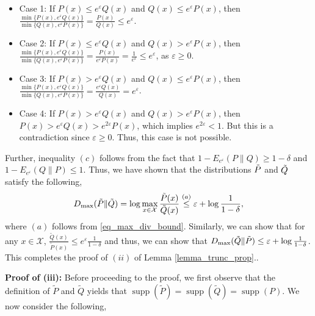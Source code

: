 \documentclass[onecolumn,ldraftcls, 11pt]{IEEEtran}
\newcommand{\supp}{\operatorname{supp}}
\newcommand{\eps}{\varepsilon}
\newcommand*{\cX}{\mathcal{X}}
\begin{document}
\begin{itemize}
    \item Case 1: If $P(x) \leq e^\eps Q(x)$ and $Q(x) \leq e^\eps P(x)$, then $\frac{\min\{P(x),e^\eps Q(x)\}}{\min\{Q(x),e^\eps P(x)\}} = \frac{P(x)}{Q(x)} \leq e^\eps $.
    \item Case 2: If $P(x) \leq e^\eps Q(x)$ and $Q(x) > e^\eps P(x)$, then $\frac{\min\{P(x),e^\eps Q(x)\}}{\min\{Q(x),e^\eps P(x)\}} = \frac{P(x)}{e^\eps P(x)} = \frac{1}{e^\eps} \leq e^\eps$, as $\eps \geq 0$.
    \item Case 3: If $P(x) > e^\eps Q(x)$ and $Q(x) \leq e^\eps P(x)$, then $\frac{\min\{P(x),e^\eps Q(x)\}}{\min\{Q(x),e^\eps P(x)\}} = \frac{e^\eps Q(x)}{Q(x)} = e^\eps$.
    \item Case 4: If $P(x) > e^\eps Q(x)$ and $Q(x) > e^\eps P(x)$, then $ P(x) > e^\eps Q(x) > e^{2\eps} P(x)$, which implies $e^{2\eps} < 1$. But this is a contradiction since $\eps \geq 0$. Thus, this case is not possible.
\end{itemize}
 Further, inequality $(c)$ follows from the fact that $1 - E_{e^\eps}(P\|Q) \geq 1-\delta$ and $1 - E_{e^\eps}(Q\|P) \leq 1$. Thus, we have shown that the distributions $\Tilde{P}$ and $\Tilde{Q}$ satisfy the following,
\begin{align*}
    D_{\max}(\Tilde{P}\|\Tilde{Q}) = \log \max_{x \in \cX} \frac{\tilde{P}(x)}{\tilde{Q}(x)}
     \overset{(a)}{\leq} \eps + \log\frac{1}{1-\delta},\\
\end{align*}
where $(a)$ follows from \eqref{eq_max_div_bound}. Similarly, we can show that for any $x \in \cX$, $\frac{\tilde{Q}(x)}{\tilde{P}(x)} \leq e^\eps \frac{1}{1-\delta}$ and thus, we can show that $D_{\max}(\Tilde{Q}\|\Tilde{P}) \leq \eps + \log\frac{1}{1-\delta}$. This completes the proof of $(ii)$ of Lemma \ref{lemma_trunc_prop}..

{\textbf{Proof of (iii):}}
Before proceeding to the proof, we first observe that the definition of $\tilde{P}$ and $\tilde{Q}$ yields that $\supp(\tilde{P}) = \supp(\tilde{Q}) = \supp(P)$. We now consider the following,
\end{document}

